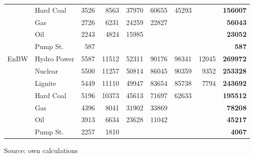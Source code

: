 \begin{table}[htb]
\begin{tabular}{llrrrrrrr}
           &  Hard Coal &       3526 &       8563 &      37970 &      60655 &      45293 &            & {\bf 156007} \\

           &        Gas &       2726 &       6231 &      24259 &      22827 &            &            & {\bf 56043} \\

           &        Oil &       2243 &       4824 &      15985 &            &            &            & {\bf 23052} \\

           &   Pump St. &        587 &            &            &            &            &            &  {\bf 587} \\
\hline
      EnBW & Hydro Power &       5587 &      11512 &      52311 &      90176 &      98341 &      12045 & {\bf 269972} \\

           &    Nuclear &       5500 &      11257 &      50814 &      86045 &      90359 &       9352 & {\bf 253328} \\

           &    Lignite &       5449 &      11110 &      49947 &      83654 &      85738 &       7794 & {\bf 243692} \\

           &  Hard Coal &       5196 &      10373 &      45613 &      71697 &      62633 &            & {\bf 195512} \\

           &        Gas &       4396 &       8041 &      31902 &      33869 &            &            & {\bf 78208} \\

           &        Oil &       3913 &       6634 &      23628 &      11042 &            &            & {\bf 45217} \\

           &   Pump St. &       2257 &       1810 &            &            &            &            & {\bf 4067} \\
\hline
\hline
\end{tabular}  

\begin{center}
Source: own calculations
\end{center}
\end{table}